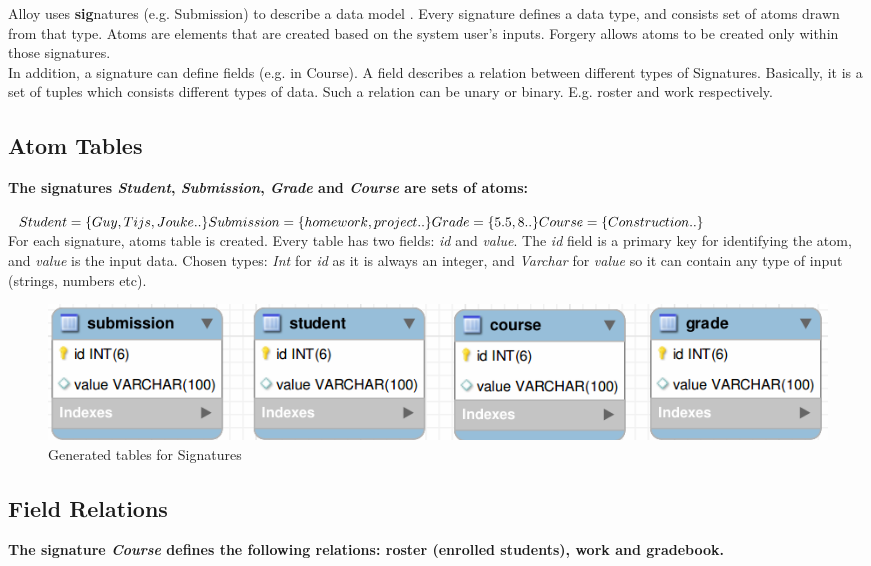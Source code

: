 \documentclass[oneside]{book}
\begin{document}
\noindent Alloy uses \textbf{sig}natures (e.g. Submission) to describe a data model \cite[p.~30]{alloy-manual}. Every signature defines a data type, and consists set of atoms drawn from that type. Atoms are elements that are created based on the system user's inputs. Forgery allows atoms to be created only within those signatures. \\

\noindent In addition, a signature can define fields (e.g. in Course). A field describes a relation between different types of Signatures. Basically, it is a set of tuples which consists different types of data. Such a relation can be unary or binary. E.g. roster and work respectively.

\newpage
\subsection{Atom Tables}
\textbf{The signatures \textit{Student}, \textit{Submission}, \textit{Grade} and \textit{Course} are sets of atoms:}

\noindent$Student = \{Guy, Tijs, Jouke ..\}\\
Submission = \{homework, project ..\}\\
Grade = \{5.5, 8 ..\} \\
Course = \{Construction ..\}$\\

\noindent For each signature, atoms table is created. Every table has two fields: \textit{id} and \textit{value}.
The \textit{id} field is a primary key for identifying the atom, and \textit{value} is the input data.
Chosen types: \textit{Int} for \textit{id} as it is always an integer, and \textit{Varchar} for \textit{value} so it can contain any type of input (strings, numbers etc).

\begin{figure}[h!]
\centering
\includegraphics[scale=0.5]{1}
\caption{Generated tables for Signatures}
\end{figure}

\newpage
\subsection{Field Relations}
\textbf{The signature \textit{Course} defines the following relations: roster (enrolled students), work and gradebook.}
\end{document}
